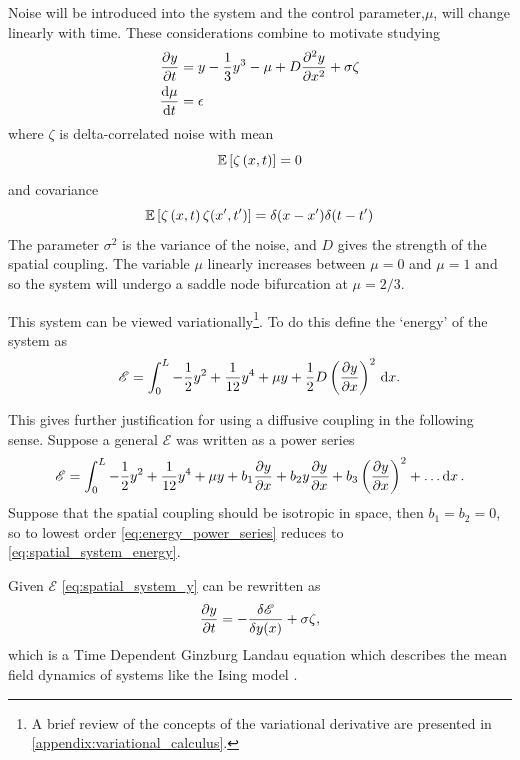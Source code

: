 Noise will be introduced into the system and the control parameter,$\mu$,  will change linearly with time. These considerations combine to motivate studying
\begin{subequations}
\label{eq:spatial_system}
  \begin{align}
    \pdv{y}{t} &= y - \frac{1}{3}y^3 - \mu + D\pdv[2]{y}{x} + \sigma\zeta \label{eq:spatial_system_y} \\
    \dv{\mu}{t}&= \epsilon \label{eq:spatial_system_mu}
  \end{align}
\end{subequations}
where $\zeta$ is delta-correlated noise with mean
\begin{equation}
  \label{eq:delta_mean}
  \operatorname*{\mathbb{E}} \left[\zeta\left(x,t\right)\right] = 0 
\end{equation}
and covariance
\begin{equation}
  \label{eq:delta_cov}
  \operatorname*{\mathbb{E}} \left[\zeta\left(x,t\right)\zeta(x',t')\right] = \delta(x-x')\delta(t-t') 
\end{equation}
The parameter $\sigma^2$ is the variance of the noise, and $D$ gives the strength of the spatial coupling.
The variable $\mu$ linearly increases between $\mu = 0$ and $\mu = 1$ and so the system will undergo a saddle node bifurcation at $\mu = 2/3$. 

This system can be viewed variationally\footnote{A brief review of the concepts of the variational derivative are presented in \cref{appendix:variational_calculus}.}.
To do this define the `energy' of the system as
\begin{equation}
  \label{eq:spatial_system_energy}
  \mathscr{E} = \int_0^L -\frac{1}{2}y^2 + \frac{1}{12}y^4 + \mu y + \frac{1}{2}D\left(\pdv{y}{x}\right)^2\,\mathrm{d}{x}.
\end{equation}

This gives further justification for using a diffusive coupling in the following sense. Suppose a general $\mathscr{E}$ was written as a power series
\begin{equation}
  \label{eq:energy_power_series}
  \mathscr{E} = \int_0^L  -\frac{1}{2}y^2 + \frac{1}{12}y^4 + \mu y + b_1 \pdv{y}{x} + b_2 y \pdv{y}{x} + b_3 \left(\pdv{y}{x}\right)^2 + \ldots \dd{x}.
\end{equation}
Suppose that the spatial coupling should be isotropic in space, then $b_1 = b_2 = 0$, so to lowest order \cref{eq:energy_power_series} reduces to
\cref{eq:spatial_system_energy}.

Given $\mathscr{E}$ \cref{eq:spatial_system_y} can be rewritten as
\begin{equation}
  \label{eq:spatial_system_y_variational}
    \pdv{y}{t} = -\fdv{\mathscr{E}}{y(x)}  + \sigma\zeta, 
\end{equation}
which is a Time Dependent Ginzburg Landau equation which describes the mean field dynamics of systems like the Ising model \parencite{goldenfeld1992}.

